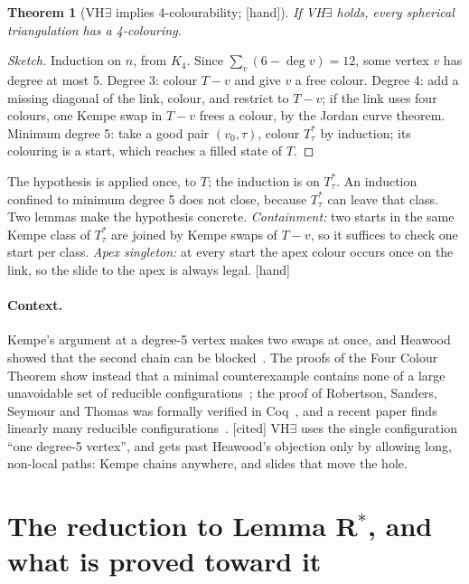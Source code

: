 \documentclass[11pt]{article}
\newtheorem{theorem}{Theorem}\newtheorem{lemma}{Lemma}\newtheorem{conjecture}{Conjecture}
\newcommand{\lab}[1]{\textsf{[#1]}}
\begin{document}
\begin{theorem}[VH$\exists$ implies 4-colourability; \lab{hand}]\label{thm:A}
If VH$\exists$ holds, every spherical triangulation has a 4-colouring.
\end{theorem}
\begin{proof}[Sketch]
Induction on $n$, from $K_4$. Since $\sum_v(6-\deg v)=12$, some vertex $v$ has degree at most 5. Degree 3: colour $T-v$ and give $v$ a free colour. Degree 4: add a missing diagonal of the link, colour, and restrict to $T-v$; if the link uses four colours, one Kempe swap in $T-v$ frees a colour, by the Jordan curve theorem. Minimum degree 5: take a good pair $(v_0,\tau)$, colour $T^\ast_\tau$ by induction; its colouring is a start, which reaches a filled state of $T$.
\end{proof}
The hypothesis is applied once, to $T$; the induction is on $T^\ast_\tau$. An induction confined to minimum degree 5 does not close, because $T^\ast_\tau$ can leave that class. Two lemmas make the hypothesis concrete. \emph{Containment:} two starts in the same Kempe class of $T^\ast_\tau$ are joined by Kempe swaps of $T-v$, so it suffices to check one start per class. \emph{Apex singleton:} at every start the apex colour occurs once on the link, so the slide to the apex is always legal. \lab{hand}

\paragraph{Context.} Kempe's argument at a degree-5 vertex makes two swaps at once, and Heawood showed that the second chain can be blocked~\cite{kempe1879,heawood1890}. The proofs of the Four Colour Theorem show instead that a minimal counterexample contains none of a large unavoidable set of reducible configurations~\cite{birkhoff1913,appel1977,robertson1997}; the proof of Robertson, Sanders, Seymour and Thomas was formally verified in Coq~\cite{gonthier}, and a recent paper finds linearly many reducible configurations~\cite{inoue2026}. \lab{cited} VH$\exists$ uses the single configuration ``one degree-5 vertex'', and gets past Heawood's objection only by allowing long, non-local paths: Kempe chains anywhere, and slides that move the hole.

\section{The reduction to Lemma R$^\ast$, and what is proved toward it}\label{sec:rstar}
\end{document}
